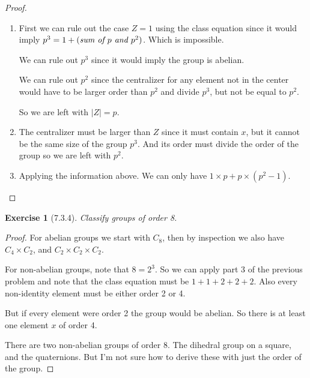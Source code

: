 \documentclass[12pt]{article}
\newtheorem*{exer}{Exercise}
\begin{document}
\begin{proof}

    \begin{enumerate}
        \item First we can rule out the case $Z = 1$ using the class
            equation since it would imply $p^3 = 1 + (\text{\it{sum of
            $p$ and $p^2$}})$. Which is impossible. 

            We can rule out $p^3$ since it would imply the group is
            abelian.

            We can rule out $p^2$ since the centralizer for any element
            not in the center would have to be larger order than $p^2$
            and divide $p^3$, but not be equal to $p^2$.

            So we are left with $|Z| = p$.

        \item The centralizer must be larger than $Z$ since it must
            contain $x$, but it cannot be the same size of the group
            $p^3$. And its order must divide the order of the group so
            we are left with $p^2$.

        \item Applying the information above. We can only have $1 \times
            p + p \times (p^2 - 1)$.
            
    \end{enumerate}

\end{proof}


\begin{exer}[7.3.4]

    Classify groups of order 8.

\end{exer}

\begin{proof}

    For abelian groups we start with $C_8$, then by inspection we also
    have $C_4 \times C_2$, and $C_2 \times C_2 \times C_2$.

    For non-abelian groups, note that $8 = 2^3$. So we can apply part 3
    of the previous problem and note that the class equation must be $1
    + 1 + 2 + 2 + 2$. Also every non-identity element must be either
    order 2 or 4.

    But if every element were order 2 the group would be abelian. So
    there is at least one element $x$ of order 4. 

    There are two non-abelian groups of order 8. The dihedral group on a
    square, and the quaternions. But I'm not sure how to derive these
    with just the order of the group.

\end{proof}
\end{document}
